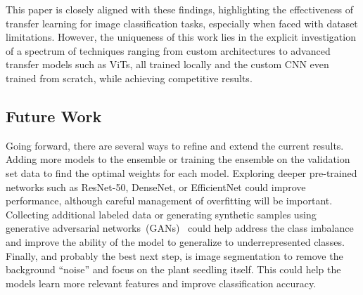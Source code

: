This paper is closely aligned with these findings, highlighting the effectiveness of transfer learning for image classification tasks, especially when faced with dataset limitations. However, the uniqueness of this work lies in the explicit investigation of a spectrum of techniques ranging from custom architectures to advanced transfer models such as ViTs, all trained locally and the custom CNN even trained from scratch, while achieving competitive results.

\subsection{Future Work}

Going forward, there are several ways to refine and extend the current results. Adding more models to the ensemble or training the ensemble on the validation set data to find the optimal weights for each model. Exploring deeper pre-trained networks such as ResNet-50, DenseNet, or EfficientNet could improve performance, although careful management of overfitting will be important. Collecting additional labeled data or generating synthetic samples using generative adversarial networks~(GANs)~\cite{goodfellow2014generativeadversarialnetworks} could help address the class imbalance and improve the ability of the model to generalize to underrepresented classes. Finally, and probably the best next step, is image segmentation to remove the background ``noise'' and focus on the plant seedling itself. This could help the models learn more relevant features and improve classification accuracy.
